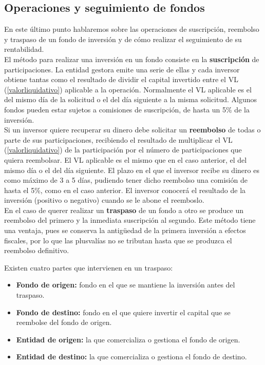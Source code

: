 \documentclass[12pt, a4paper]{book}
\begin{document}
 \subsection{Operaciones y seguimiento de fondos}

En este último punto hablaremos sobre las operaciones de suscripción, reembolso y traspaso de un fondo de inversión y de cómo realizar el seguimiento de su rentabilidad.\\

El método para realizar una inversión en un fondo consiste en la \textbf{suscripción} de participaciones. La entidad gestora emite una serie de ellas y cada inversor obtiene tantas como el resultado de dividir el capital invertido entre el \gls{VL} (\ref{valorliquidativo}) aplicable a la operación. Normalmente el \gls{VL} aplicable es el del mismo día de la solicitud o el del día siguiente a la misma solicitud. Algunos fondos pueden estar sujetos a comisiones de suscripción, de hasta un 5\% de la inversión.\\

Si un inversor quiere recuperar su dinero debe solicitar un \textbf{reembolso} de todas o parte de sus participaciones, recibiendo el resultado de multiplicar el \gls{VL} (\ref{valorliquidativo}) de la participación por el número de participaciones que quiera reembolsar. El \gls{VL} aplicable es el mismo que en el caso anterior, el del mismo día o el del día siguiente. 
El plazo en el que el inversor recibe su dinero es como máximo de 3 a 5 días, pudiendo tener dicho reembolso una comisión de hasta el 5\%, como en el caso anterior. El inversor conocerá el resultado de la inversión (positivo o negativo) cuando se le abone el reemboslo.\\

En el caso de querer realizar un \textbf{traspaso} de un fondo a otro se produce un reembolso del primero y la inmediata suscripción al segundo. Este método tiene una ventaja, pues se conserva la antigüedad de la primera inversión a efectos fiscales, por lo que las plusvalías no se tributan hasta que se produzca el reembolso definitivo.\\

\newpage

Existen cuatro partes que intervienen en un traspaso:

\begin{itemize}
	\item \textbf{Fondo de origen:} fondo en el que se mantiene la inversión antes del traspaso.
	\item \textbf{Fondo de destino:} fondo en el que quiere invertir el capital que se reembolse del fondo de origen.
	\item \textbf{Entidad de origen:} la que comercializa o gestiona el fondo de origen.
	\item \textbf{Entidad de destino:} la que comercializa o gestiona el fondo de destino.
\end{itemize}
\end{document}
